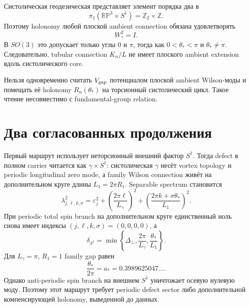 Систолическая геодезическая представляет элемент порядка два в
\begin{equation}
 \pi_1(\mathbb{RP}^3\times S^1)=\mathbb Z_2\times\mathbb Z.
\end{equation}
Поэтому holonomy любой плоской ambient connection обязана удовлетворять
\begin{equation}
 W_\gamma^2=I.
\end{equation}
В \(SO(3)\) это допускает только углы \(0\) и \(\pi\), тогда как
\(0<\theta_*<\pi\) и \(\theta_*\ne\pi\). Следовательно, tubular connection
\(K_n/L\) не имеет плоского ambient extension вдоль систолического core.

\begin{nogocriterion}
Нельзя одновременно считать \(V_{\rm gap}\) потенциалом плоской ambient
Wilson-моды и помещать её holonomy \(R_n(\theta_*)\) на торсионный
систолический цикл. Такое чтение несовместимо с fundamental-group relation.
\end{nogocriterion}

\section{Два согласованных продолжения}

Первый маршрут использует неторсионный внешний фактор \(S^1\). Тогда defect
в полном carrier читается как \(\gamma\times S^1\): систолическая
\(\gamma\) несёт vortex topology и periodic longitudinal zero mode, а
family Wilson connection живёт на дополнительном круге длины
\(L_1=2\pi R_1\). Separable spectrum становится
\begin{equation}
 \lambda_{j,\ell,k,\sigma}^2
 =\varepsilon_j^2+
 \left(\frac{2\pi\ell}{L_\gamma}\right)^2+
 \left(\frac{2\pi k+\sigma\theta_*}{L_1}\right)^2.
\end{equation}
При periodic total spin branch на дополнительном круге единственный ноль
снова имеет индексы \((j,\ell,k,\sigma)=(0,0,0,0)\), а
\begin{equation}
 \delta_{S^1}
 =\min\left\{
 \Delta_\perp,
 \frac{2\pi}{L_\gamma},
 \frac{\theta_*}{L_1}
 \right\}.
\end{equation}
Для \(L_\gamma=\pi\), \(R_1=1\) family gap равен
\begin{equation}
 \frac{\theta_*}{2\pi}=a_*=0.3989625047\ldots.
\end{equation}
Однако anti-periodic spin branch на внешнем \(S^1\) уничтожает осевую
нулевую моду. Поэтому этот маршрут требует periodic defect sector либо
дополнительной компенсирующей holonomy, выведенной до данных.

